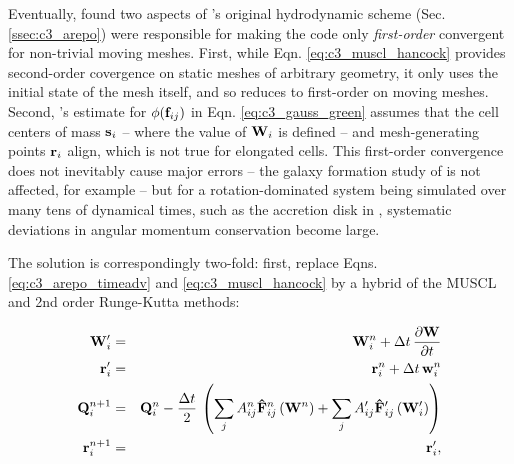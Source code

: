 
Eventually, \cite{pakm+16} found two aspects of \arepo's original hydrodynamic scheme (Sec. \ref{ssec:c3_arepo}) were responsible for making the code only \textit{first-order} convergent for non-trivial moving meshes.  First, while Eqn. \ref{eq:c3_muscl_hancock} provides second-order covergence on static meshes of arbitrary geometry, it only uses the initial state of the mesh itself, and so reduces to first-order on moving meshes.  Second, \arepo's estimate for $\phi({\bf f}_{ij})$ in Eqn. \ref{eq:c3_gauss_green} assumes that the cell centers of mass ${\bf s}_i$ -- where the value of ${\bf W}_i$ is defined -- and mesh-generating points ${\bf r}_i$ align, which is not true for elongated cells.  This first-order convergence does not inevitably cause major errors -- the galaxy formation study of \cite{marips14} is not affected, for example -- but for a rotation-dominated system being simulated over many tens of dynamical times, such as the accretion disk in \cite{pakm+16}, systematic deviations in angular momentum conservation become large.

The solution is correspondingly two-fold: first, replace Eqns. \ref{eq:c3_arepo_timeadv} and \ref{eq:c3_muscl_hancock} by a hybrid of the MUSCL and 2nd order Runge-Kutta methods:

\begin{eqnarray}
{\bf W}^\prime_i &=& {\bf W}^n_i + \Delta t \, \frac{\partial {\bf W}}{\partial t} \nonumber \\
{\bf r}_i^\prime &=& {\bf r}_i^n +  \Delta t \, {\bf w}_i^n \nonumber \\
{\bf Q}^{n+1}_i &=& {\bf Q}^n_i - \frac{\Delta t}{2} \, \left( \sum_j A^n_{ij} {\bf \hat{F}}_{ij}^{n} \left( {\bf W}^n \right) + \sum_j A^\prime_{ij} {\bf \hat{F}}_{ij}^{\prime} \left( {\bf W}_i^\prime \right) \right) \nonumber \\
{\bf r}_i^{n+1} &=& {\bf r}_i^\prime,
\label{eq:c3_rk2_timeevo}
\end{eqnarray}

